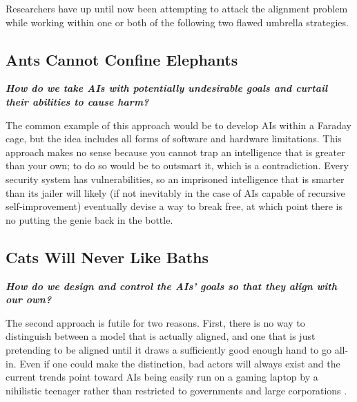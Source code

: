 \documentclass{article}[10pt]
\begin{document}
Researchers have up until now been attempting to attack the alignment problem while working within one or both of the following two flawed umbrella strategies.\par

\subsection{Ants Cannot Confine Elephants}
\label{subsection:antsElephants}

\noindent \begin{center}\begin{minipage}[t]{0.9\columnwidth}
    \textbf{\textit{How do we take AIs with potentially undesirable goals and curtail their abilities to cause harm?}}
\end{minipage}\end{center}
\vspace{0.05in}

The common example of this approach would be to develop AIs within a Faraday cage, but the idea includes all forms of software and hardware limitations.
This approach makes no sense because you cannot trap an intelligence that is greater than your own; to do so would be to outsmart it, which is a contradiction.
Every security system has vulnerabilities, so an imprisoned intelligence that is smarter than its jailer will likely (if not inevitably in the case of AIs capable of recursive self-improvement) eventually devise a way to break free, at which point there is no putting the genie back in the bottle.\par

\subsection{Cats Will Never Like Baths}
\label{subsection:catsBaths}

\noindent \begin{center}\begin{minipage}[t]{0.9\columnwidth}
    \textbf{\textit{How do we design and control the AIs’ goals so that they align with our own?}}
\end{minipage}\end{center} 
\vspace{0.05in}

The second approach is futile for two reasons. First, there is no way to distinguish between a model that is actually aligned, and one that is just pretending to be aligned until it draws a sufficiently good enough hand to go all-in. 
Even if one could make the distinction, bad actors will always exist and the current trends point toward AIs being easily run on a gaming laptop by a nihilistic teenager rather than restricted to governments and large corporations \cite{noMoat}.\par
\end{document}

